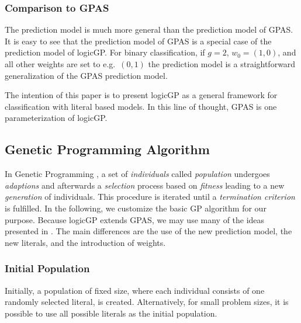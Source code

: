 \documentclass[dvipsnames,format=sigconf,anonymous=false,review=false]{acmart}
\begin{document}
\subsubsection{Comparison to GPAS}

The prediction model is much more general than the prediction model of GPAS. It is easy to see that the prediction model of GPAS is a special case of the prediction model of logicGP. For binary classification, if $g=2$, $w_0=(1,0)$, and all other weights are set to e.g.\ $(0,1)$ the prediction model is a straightforward generalization of the GPAS prediction model. 

The intention of this paper is to present logicGP as a general framework for classification with literal based models. In this line of thought, GPAS is one parameterization of logicGP. 




\subsection{Genetic Programming Algorithm}

In Genetic Programming \citep{Koza1992}, a set of \emph{individuals} called \emph{population}
undergoes \emph{adaptions} and afterwards a \emph{selection} process based on \emph{fitness}
leading to a new \emph{generation} of individuals. This procedure is iterated until a \emph{termination criterion} is fulfilled. In the following, we customize the basic GP algorithm for our
purpose. Because logicGP extends GPAS, we may use many of the ideas presented in \citet{10.1093/bioinformatics/btm522}. The main differences are the use of the new prediction model, the new literals, and the introduction of weights.

\subsubsection{Initial Population}

Initially, a population of fixed size, where each individual consists of one randomly
selected literal, is created. Alternatively, for small problem sizes, it is possible to use all possible literals as the initial population.
\end{document}
